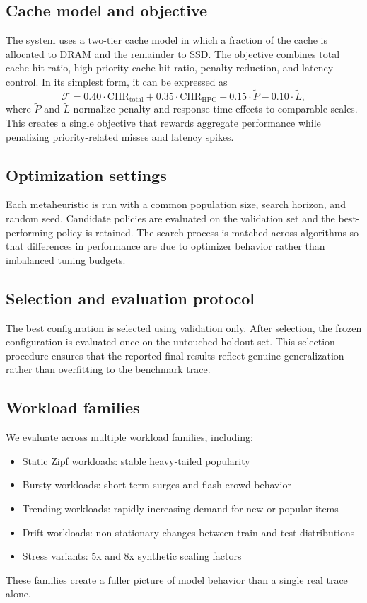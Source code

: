 \documentclass[10pt,journal,compsoc]{IEEEtran}
\begin{document}
\subsection{Cache model and objective}
The system uses a two-tier cache model in which a fraction of the cache is allocated to DRAM and the remainder to SSD. The objective combines total cache hit ratio, high-priority cache hit ratio, penalty reduction, and latency control. In its simplest form, it can be expressed as
\begin{equation}
\mathcal{F} = 0.40 \cdot \text{CHR}_{\text{total}} + 0.35 \cdot \text{CHR}_{\text{HPC}} - 0.15 \cdot \tilde{P} - 0.10 \cdot \tilde{L},
\end{equation}
where $\tilde{P}$ and $\tilde{L}$ normalize penalty and response-time effects to comparable scales. This creates a single objective that rewards aggregate performance while penalizing priority-related misses and latency spikes.

\subsection{Optimization settings}
Each metaheuristic is run with a common population size, search horizon, and random seed. Candidate policies are evaluated on the validation set and the best-performing policy is retained. The search process is matched across algorithms so that differences in performance are due to optimizer behavior rather than imbalanced tuning budgets.

\subsection{Selection and evaluation protocol}
The best configuration is selected using validation only. After selection, the frozen configuration is evaluated once on the untouched holdout set. This selection procedure ensures that the reported final results reflect genuine generalization rather than overfitting to the benchmark trace.

\subsection{Workload families}
We evaluate across multiple workload families, including:
\begin{itemize}
    \item Static Zipf workloads: stable heavy-tailed popularity
    \item Bursty workloads: short-term surges and flash-crowd behavior
    \item Trending workloads: rapidly increasing demand for new or popular items
    \item Drift workloads: non-stationary changes between train and test distributions
    \item Stress variants: 5x and 8x synthetic scaling factors
\end{itemize}
These families create a fuller picture of model behavior than a single real trace alone.
\end{document}
